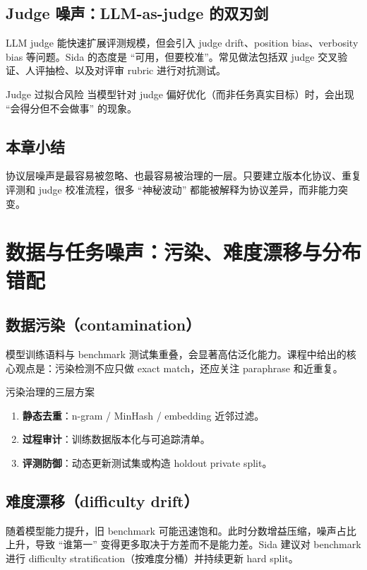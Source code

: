 \documentclass[a4paper]{article}
\begin{document}
\subsection{Judge 噪声：LLM-as-judge 的双刃剑}
LLM judge 能快速扩展评测规模，但会引入 judge drift、position bias、verbosity bias 等问题。Sida 的态度是 ``可用，但要校准''。常见做法包括双 judge 交叉验证、人评抽检、以及对评审 rubric 进行对抗测试。

\begin{warningbox}{Judge 过拟合风险}
当模型针对 judge 偏好优化（而非任务真实目标）时，会出现 ``会得分但不会做事'' 的现象。
\end{warningbox}

\subsection{本章小结}
协议层噪声是最容易被忽略、也最容易被治理的一层。只要建立版本化协议、重复评测和 judge 校准流程，很多 ``神秘波动'' 都能被解释为协议差异，而非能力突变。

\section{数据与任务噪声：污染、难度漂移与分布错配}

\subsection{数据污染（contamination）}
模型训练语料与 benchmark 测试集重叠，会显著高估泛化能力。课程中给出的核心观点是：污染检测不应只做 exact match，还应关注 paraphrase 和近重复。

\begin{importantbox}{污染治理的三层方案}
\begin{enumerate}
    \item \textbf{静态去重}：n-gram / MinHash / embedding 近邻过滤。
    \item \textbf{过程审计}：训练数据版本化与可追踪清单。
    \item \textbf{评测防御}：动态更新测试集或构造 holdout private split。
\end{enumerate}
\end{importantbox}

\subsection{难度漂移（difficulty drift）}
随着模型能力提升，旧 benchmark 可能迅速饱和。此时分数增益压缩，噪声占比上升，导致 ``谁第一'' 变得更多取决于方差而不是能力差。Sida 建议对 benchmark 进行 difficulty stratification（按难度分桶）并持续更新 hard split。
\end{document}
